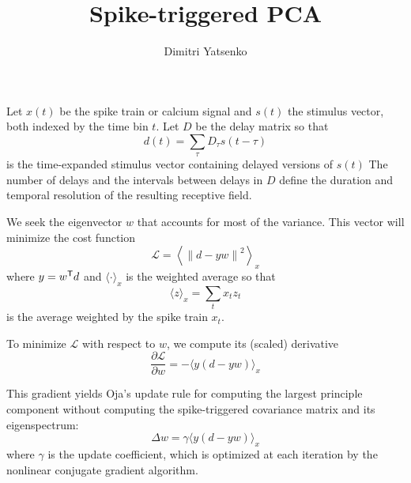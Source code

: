 \documentclass[10pt,twocolumn]{article}
\title{Spike-triggered PCA}
\author{Dimitri Yatsenko}
\newcommand{\T}{{\sf T}}
\begin{document}
\maketitle
Let $x(t)$ be the spike train or calcium signal and $s(t)$ the stimulus vector, both indexed by the time bin $t$. 
Let $D$ be the delay matrix so that 
\begin{equation}
d(t) = \sum\limits_\tau D_\tau s(t-\tau)
\end{equation}
is the time-expanded stimulus vector containing delayed versions of $s(t)$
The number of delays and the intervals between delays in $D$ define the duration and temporal resolution of the resulting receptive field.

We seek the eigenvector $w$ that accounts for most of the variance.  This vector will minimize the cost function 
\begin{equation}
\mathcal L = \left\langle \left\| d -y w \right\|^2 \right\rangle_x 
\end{equation}
where $y=w^\T d$ and $\langle\cdot\rangle_x$ is the weighted average so that 
\begin{equation}
\langle z \rangle_x = \sum\limits_t x_t z_t
\end{equation}
is the average weighted by the spike train $x_t$.

To minimize $\mathcal L$ with respect to $w$, we compute its (scaled) derivative
\begin{equation}
\frac{\partial \mathcal L}{\partial w} =
-\langle y(d-y w) \rangle_x
\end{equation}

This gradient yields Oja's update rule for computing the largest principle component without computing the spike-triggered covariance matrix and its eigenspectrum:
\begin{equation}
\Delta w = \gamma \langle y(d-yw) \rangle_x
\end{equation}
where $\gamma$ is the update coefficient, which is optimized at each iteration by the nonlinear conjugate gradient algorithm.
\end{document}
